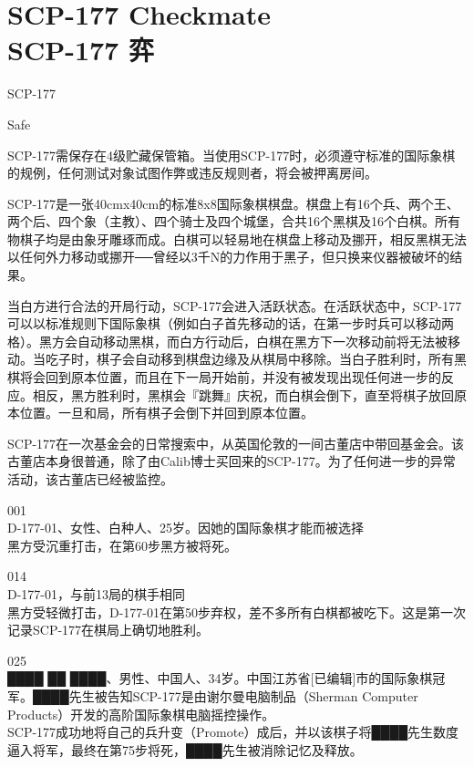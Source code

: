 \chapter[SCP-177 弈]{
    SCP-177 Checkmate\\
    SCP-177 弈
}

\label{chap:SCP-177}

SCP-177

Safe

SCP-177需保存在4级贮藏保管箱。当使用SCP-177时，必须遵守标准的国际象棋的规例，任何测试对象试图作弊或违反规则者，将会被押离房间。

SCP-177是一张40cmx40cm的标准8x8国际象棋棋盘。棋盘上有16个兵、两个王、两个后、四个象（主教）、四个骑士及四个城堡，合共16个黑棋及16个白棋。所有物棋子均是由象牙雕琢而成。白棋可以轻易地在棋盘上移动及挪开，相反黑棋无法以任何外力移动或挪开──曾经以3千N的力作用于黑子，但只换来仪器被破坏的结果。

当白方进行合法的开局行动，SCP-177会进入活跃状态。在活跃状态中，SCP-177可以以标准规则下国际象棋（例如白子首先移动的话，在第一步时兵可以移动两格）。黑方会自动移动黑棋，而白方行动后，白棋在黑方下一次移动前将无法被移动。当吃子时，棋子会自动移到棋盘边缘及从棋局中移除。当白子胜利时，所有黑棋将会回到原本位置，而且在下一局开始前，并没有被发现出现任何进一步的反应。相反，黑方胜利时，黑棋会『跳舞』庆祝，而白棋会倒下，直至将棋子放回原本位置。一旦和局，所有棋子会倒下并回到原本位置。

SCP-177在一次基金会的日常搜索中，从英国伦敦的一间古董店中带回基金会。该古董店本身很普通，除了由Calib博士买回来的SCP-177。为了任何进一步的异常活动，该古董店已经被监控。


001\\
D-177-01、女性、白种人、25岁。因她的国际象棋才能而被选择\\
黑方受沉重打击，在第60步黑方被将死。

014\\
D-177-01，与前13局的棋手相同\\
黑方受轻微打击，D-177-01在第50步弃权，差不多所有白棋都被吃下。这是第一次记录SCP-177在棋局上确切地胜利。

025\\
████ ██ ████、男性、中国人、34岁。中国江苏省{[}已编辑]市的国际象棋冠军。████先生被告知SCP-177是由谢尔曼电脑制品（Sherman Computer Products）开发的高阶国际象棋电脑摇控操作。\\
SCP-177成功地将自己的兵升变（Promote）成后，并以该棋子将████先生数度逼入将军，最终在第75步将死，████先生被消除记忆及释放。

